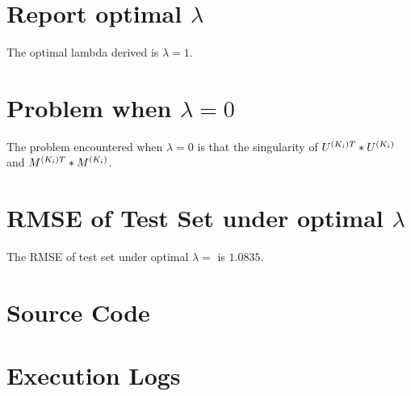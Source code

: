 \documentclass[11pt,a4paper]{article}
\begin{document}
\section{Report optimal $\lambda$}
The optimal lambda derived is $\lambda = 1$.

\section{Problem when $\lambda = 0$}
The problem encountered when $\lambda = 0$ is that the singularity of
$U^{(K_i) T} * U^{(K_i)}$ and $M^{(K_i) T} * M^{(K_i)}$.


\section{RMSE of Test Set under optimal $\lambda$}
The RMSE of test set under optimal $\lambda = $ is $1.0835$.

\newpage
\appendix
\section{Source Code}
\label{AppdendixA}

\section{Execution Logs}
\label{AppdendixB}


\end{document}
